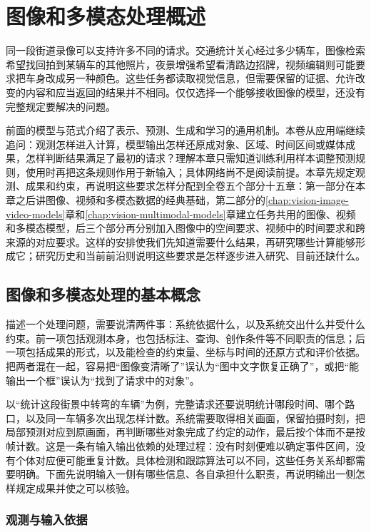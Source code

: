 \chapter{图像和多模态处理概述}
\label{chap:vision-overview}

同一段街道录像可以支持许多不同的请求。交通统计关心经过多少辆车，图像检索希望找回拍到某辆车的其他照片，夜景增强希望看清路边招牌，视频编辑则可能要求把车身改成另一种颜色。这些任务都读取视觉信息，但需要保留的证据、允许改变的内容和应当返回的结果并不相同。仅仅选择一个能够接收图像的模型，还没有完整规定要解决的问题。

前面的模型与范式介绍了表示、预测、生成和学习的通用机制。本卷从应用端继续追问：观测怎样进入计算，模型输出怎样还原成对象、区域、时间区间或媒体成果，怎样判断结果满足了最初的请求？理解本章只需知道训练利用样本调整预测规则，使用时再把这条规则作用于新输入；具体网络尚不是阅读前提。本章先规定观测、成果和约束，再说明这些要求怎样分配到全卷五个部分十五章：第一部分在本章之后讲图像、视频和多模态数据的经典基础，第二部分的\ref{chap:vision-image-video-models}章和\ref{chap:vision-multimodal-models}章建立任务共用的图像、视频和多模态模型，后三个部分再分别加入图像中的空间要求、视频中的时间要求和跨来源的对应要求。这样的安排使我们先知道需要什么结果，再研究哪些计算能够形成它；研究历史和当前前沿则说明这些要求是怎样逐步进入研究、目前还缺什么。

\section{图像和多模态处理的基本概念}
\label{sec:vision-overview-concepts}

描述一个处理问题，需要说清两件事：系统依据什么，以及系统交出什么并受什么约束。前一项包括观测本身，也包括标注、查询、创作条件等不同职责的信息；后一项包括成果的形式，以及能检查的约束量、坐标与时间的还原方式和评价依据。把两者混在一起，容易把“图像变清晰了”误认为“图中文字恢复正确了”，或把“能输出一个框”误认为“找到了请求中的对象”。

以“统计这段街景中转弯的车辆”为例，完整请求还要说明统计哪段时间、哪个路口，以及同一车辆多次出现怎样计数。系统需要取得相关画面，保留拍摄时刻，把局部预测对应到原画面，再判断哪些对象完成了约定的动作，最后按个体而不是按帧计数。这是一条有输入输出依赖的处理过程：没有时刻便难以确定事件区间，没有个体对应便可能重复计数。具体检测和跟踪算法可以不同，这些任务关系却都需要明确。下面先说明输入一侧有哪些信息、各自承担什么职责，再说明输出一侧怎样规定成果并使之可以核验。

\subsection{观测与输入依据}
\label{sec:vision-overview-observations}

